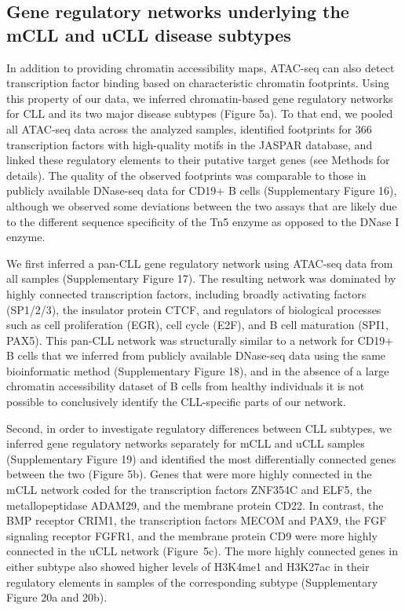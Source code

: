 \documentclass[10pt,]{article}
\begin{document}
\subsection{Gene regulatory networks underlying the mCLL and uCLL
disease
subtypes}\label{gene-regulatory-networks-underlying-the-mcll-and-ucll-disease-subtypes}

In addition to providing chromatin accessibility maps, ATAC-seq can also
detect transcription factor binding based on characteristic chromatin
footprints\citep{Buenrostro2013}. Using this property of our data, we
inferred chromatin-based gene regulatory networks for CLL and its two
major disease subtypes (Figure 5a). To that end, we pooled all ATAC-seq
data across the analyzed samples, identified footprints for 366
transcription factors with high-quality motifs in the JASPAR
database\citep{Mathelier2014}, and linked these regulatory elements to
their putative target genes (see Methods for details). The quality of
the observed footprints was comparable to those in publicly available
DNase-seq data for CD19+ B cells (Supplementary Figure 16), although we
observed some deviations between the two assays that are likely due to
the different sequence specificity of the Tn5 enzyme as opposed to the
DNase I enzyme.

We first inferred a pan-CLL gene regulatory network using ATAC-seq data
from all samples (Supplementary Figure 17). The resulting network was
dominated by highly connected transcription factors, including broadly
activating factors (SP1/2/3), the insulator protein CTCF, and regulators
of biological processes such as cell proliferation (EGR), cell cycle
(E2F), and B cell maturation (SPI1, PAX5). This pan-CLL network was
structurally similar to a network for CD19+ B cells that we inferred
from publicly available DNase-seq data using the same bioinformatic
method (Supplementary Figure 18), and in the absence of a large
chromatin accessibility dataset of B cells from healthy individuals it
is not possible to conclusively identify the CLL-specific parts of our
network.

Second, in order to investigate regulatory differences between CLL
subtypes, we inferred gene regulatory networks separately for mCLL and
uCLL samples (Supplementary Figure 19) and identified the most
differentially connected genes between the two (Figure 5b). Genes that
were more highly connected in the mCLL network coded for the
transcription factors ZNF354C and ELF5, the metallopeptidase ADAM29, and
the membrane protein CD22. In contrast, the BMP receptor CRIM1, the
transcription factors MECOM and PAX9, the FGF signaling receptor FGFR1,
and the membrane protein CD9 were more highly connected in the uCLL
network (Figure~5c). The more highly connected genes in either subtype
also showed higher levels of H3K4me1 and H3K27ac in their regulatory
elements in samples of the corresponding subtype (Supplementary Figure
20a and 20b).
\end{document}
